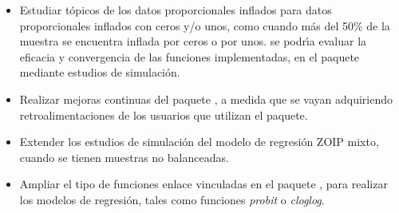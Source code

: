 \begin{itemize}
	\item Estudiar t\'{o}picos de los datos proporcionales inflados para datos proporcionales inflados con ceros y/o unos, como cuando m\'{a}s del 50\% de la muestra se encuentra inflada por ceros o por unos. se podr\'{\i}a evaluar la eficacia y convergencia de las funciones implementadas, en el paquete  mediante estudios de simulaci\'{o}n.
	\item Realizar mejoras continuas del paquete , a medida que se vayan adquiriendo retroalimentaciones de los usuarios que utilizan el paquete.
	\item Extender los estudios de simulaci\'{o}n del modelo de regresi\'{o}n ZOIP mixto, cuando se tienen muestras no balanceadas.
\item Ampliar el tipo de funciones enlace vinculadas en el paquete , para realizar los modelos de regresi\'{o}n, tales como funciones \textsl{probit} o \textsl{cloglog}.

\end{itemize}

\nocite{Seoane1}
\nocite{Lindstrom1}
\nocite{Evans1}
\nocite{kieschnick1}
\nocite{Cook1}
\nocite{Houston1}
\nocite{Venezuela1}
\nocite{Git1}
